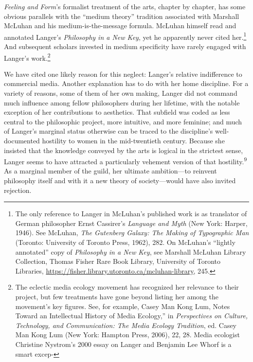 \documentclass{tufte-handout}
\begin{document}
\emph{Feeling and Form}'s formalist treatment of the arts, chapter by
chapter, has some obvious parallels with the ``medium theory'' tradition
associated with Marshall McLuhan and his medium-is-the-message formula.
McLuhan himself read and annotated Langer's \emph{Philosophy in a New
Key}, yet he apparently never cited her.\footnote{The only reference to
  Langer in McLuhan's published work is as translator of German
  philosopher Ernst Cassirer's \emph{Language and Myth} (New York:
  Harper, 1946). See McLuhan, \emph{The Gutenberg Galaxy: The Making of
  Typographic Man} (Toronto: University of Toronto Press, 1962), 282. On
  McLuhan's ``lightly annotated'' copy of \emph{Philosophy in a New
  Key}, see Marshall McLuhan Library Collection, Thomas Fisher Rare Book
  Library, University of Toronto Libraries,
  \url{https://fisher.library.utoronto.ca/mcluhan-library}, 245.} And
subsequent scholars invested in medium specificity have rarely engaged
with Langer's work.\footnote{The eclectic media ecology movement has
  recognized her relevance to their project, but few treatments have
  gone beyond listing her among the movement's key figures. See, for
  example, Casey Man Kong Lum, Notes Toward an Intellectual
  History of Media Ecology,'' in \emph{Perspectives on Culture,
  Technology, and Communication: The Media Ecology Tradition}, ed. Casey
  Man Kong Lum (New York: Hampton Press, 2006), 22, 28. Media ecologist
  Christine Nystrom's 2000 essay on Langer and Benjamin Lee Whorf is a
  smart excep-}

We have cited one likely reason for this neglect: Langer's relative
indifference to commercial media. Another explanation has to do with her
home discipline. For a variety of reasons, some of them of her own
making, Langer did not command much influence among fellow philosophers
during her lifetime, with the notable exception of her contributions to
aesthetics. That subfield was coded as less central to the philosophic
project, more intuitive, and more feminine; and much of Langer's
marginal status otherwise can be traced to the discipline's
well-documented hostility to women in the mid-twentieth century. Because
she insisted that the knowledge conveyed by the arts is logical in the
strictest sense, Langer seems to have attracted a particularly vehement
version of that hostility.\textsuperscript{9} As a marginal
member of the guild, her ultimate ambition---to reinvent philosophy
itself and with it a new theory of society---would have also invited
rejection.
\end{document}
